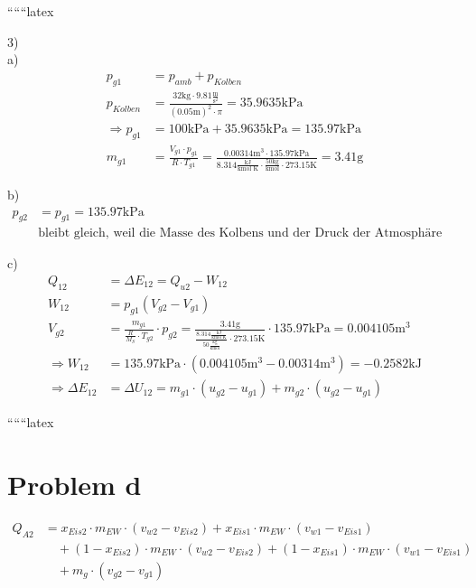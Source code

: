
``````latex


3) \\
a) 
\begin{align*}
    p_{g1} &= p_{amb} + p_{Kolben} \\
    p_{Kolben} &= \frac{32 \text{kg} \cdot 9.81 \frac{\text{m}}{\text{s}^2}}{(0.05 \text{m})^2 \cdot \pi} = 35.9635 \text{kPa} \\
    \Rightarrow p_{g1} &= 100 \text{kPa} + 35.9635 \text{kPa} = 135.97 \text{kPa} \\
    m_{g1} &= \frac{V_{g1} \cdot p_{g1}}{R \cdot T_{g1}} = \frac{0.00314 \text{m}^3 \cdot 135.97 \text{kPa}}{8.314 \frac{\text{kJ}}{\text{kmol K}} \cdot \frac{50 \text{kg}}{\text{kmol}} \cdot 273.15 \text{K}} = 3.41 \text{g}
\end{align*}

b) 
\begin{align*}
    p_{g2} &= p_{g1} = 135.97 \text{kPa} \\
    &\text{bleibt gleich, weil die Masse des Kolbens und der Druck der Atmosphäre gleich bleiben.}
\end{align*}

c) 
\begin{align*}
    Q_{12} &= \Delta E_{12} = Q_{u2} - W_{12} \\
    W_{12} &= p_{g1} \left( V_{g2} - V_{g1} \right) \\
    V_{g2} &= \frac{m_{g1}}{\frac{R}{M_S} \cdot T_{g2}} \cdot p_{g2} = \frac{3.41 \text{g}}{\frac{8.314 \frac{\text{kJ}}{\text{kmol K}}}{50 \frac{\text{kg}}{\text{kmol}}} \cdot 273.15 \text{K}} \cdot 135.97 \text{kPa} = 0.004105 \text{m}^3 \\
    \Rightarrow W_{12} &= 135.97 \text{kPa} \cdot (0.004105 \text{m}^3 - 0.00314 \text{m}^3) = -0.2582 \text{kJ} \\
    \Rightarrow \Delta E_{12} &= \Delta U_{12} = m_{g1} \cdot (u_{g2} - u_{g1}) + m_{g2} \cdot (u_{g2} - u_{g1})
\end{align*}

``````latex


\section*{Problem d}

\begin{align*}
Q_{A2} &= x_{Eis2} \cdot m_{EW} \cdot (v_{w2} - v_{Eis2}) + x_{Eis1} \cdot m_{EW} \cdot (v_{w1} - v_{Eis1}) \\
&\quad + (1 - x_{Eis2}) \cdot m_{EW} \cdot (v_{w2} - v_{Eis2}) + (1 - x_{Eis1}) \cdot m_{EW} \cdot (v_{w1} - v_{Eis1}) \\
&\quad + m_{g} \cdot (v_{g2} - v_{g1})
\end{align*}


